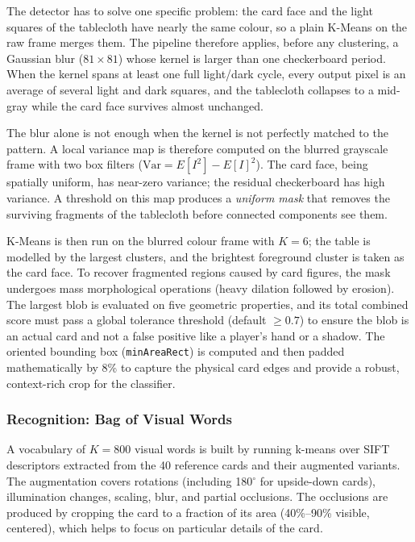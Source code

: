 \documentclass[11pt,a4paper]{article}
\begin{document}
The detector has to solve one specific problem: the card face and the light
squares of the tablecloth have nearly the same colour, so a plain K-Means on
the raw frame merges them. The pipeline therefore applies, before any
clustering, a Gaussian blur ($81\times81$) whose kernel is larger than one
checkerboard period. When the kernel spans at least one full light/dark cycle,
every output pixel is an average of several light and dark squares, and the
tablecloth collapses to a mid-gray while the card face survives almost unchanged.

The blur alone is not enough when the kernel is not perfectly matched to the
pattern. A local variance map is therefore computed on the blurred grayscale
frame with two box filters ($\mathrm{Var} = E[I^2] - E[I]^2$). The card face,
being spatially uniform, has near-zero variance; the residual checkerboard has
high variance. A threshold on this map produces a \emph{uniform mask} that
removes the surviving fragments of the tablecloth before connected components
see them.

K-Means is then run on the blurred colour frame with $K=6$; the table is
modelled by the largest clusters, and the brightest foreground cluster is taken
as the card face. To recover fragmented regions caused by card figures, the mask
undergoes mass morphological operations (heavy dilation followed by erosion).
The largest blob is evaluated on five geometric properties, and its total combined
score must pass a global tolerance threshold (default $\ge 0.7$) to ensure the blob is an actual
card and not a false positive like a player's hand or a shadow. The oriented
bounding box (\texttt{minAreaRect}) is computed and then padded mathematically
by 8\% to capture the physical card edges and provide a robust, context-rich crop
for the classifier.

\subsubsection{Recognition: Bag of Visual Words}

A vocabulary of $K=800$ visual words is built by running k-means over SIFT
descriptors extracted from the 40 reference cards and their augmented
variants. The augmentation covers rotations (including 180$^\circ$ for upside-down cards),
illumination changes, scaling, blur, and partial occlusions. The occlusions
are produced by cropping the card to a fraction of its area (40\%--90\% visible,
centered), which helps to focus on particular details of the card.
\end{document}
